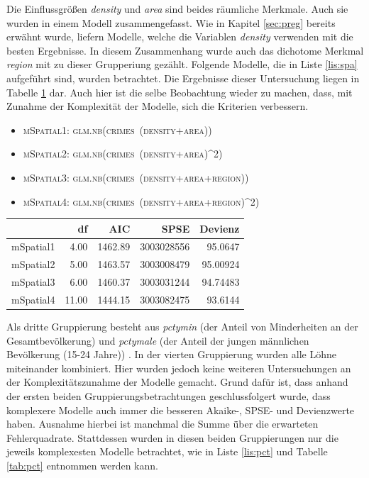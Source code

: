 \par\smallskip
Die Einflussgr\"o\ss{}en \textit{density} und \textit{area} sind beides r\"aumliche Merkmale. Auch sie wurden in einem Modell zusammengefasst. 
Wie in Kapitel \ref{sec:preg} bereits erw\"ahnt wurde, liefern Modelle, welche die Variablen \textit{density} verwenden mit die besten Ergebnisse.
In diesem Zusammenhang wurde auch das dichotome Merkmal \textit{region} mit zu dieser Grupperiung gez\"ahlt.
Folgende Modelle, die in Liste \ref{lis:spa} aufgef\"uhrt sind, wurden betrachtet.
Die Ergebnisse dieser Untersuchung liegen in Tabelle \ref{tab:spa} dar.
Auch hier ist die selbe Beobachtung wieder zu machen, dass, mit Zunahme der Komplexit\"at der Modelle, sich die Kriterien verbessern.

\begin{itemize}
\item \textsc{mSpatial1: glm.nb(crimes~(density+area))}
\item \textsc{mSpatial2: glm.nb(crimes~(density+area)^2)}
\item \textsc{mSpatial3: glm.nb(crimes~(density+area+region))}
\item \textsc{mSpatial4: glm.nb(crimes~(density+area+region)^2)}
\label{lis:spa}
\end{itemize}

\begin{table}[ht]
\centering
\begin{tabular}{rrrrr}
  \hline
 & df & AIC & SPSE & Devienz\\ 
  \hline
mSpatial1 & 4.00 & 1462.89 & 3003028556 & 95.0647\\ 
  mSpatial2 & 5.00 & 1463.57 & 3003008479 & 95.00924\\ 
  mSpatial3 & 6.00 & 1460.37 & 3003031244 & 94.74483\\ 
  mSpatial4 & 11.00 & 1444.15 & 3003082475 & 93.6144\\ 
   \hline
\end{tabular}
\label{tab:spa}
\end{table}

\par\smallskip
Als dritte Gruppierung besteht aus \textit{pctymin} (der Anteil von Minderheiten an der Gesamtbev\"olkerung) und \textit{pctymale} (der Anteil der jungen m\"annlichen Bev\"olkerung (15-24 Jahre)) .
In der vierten Gruppierung wurden alle L\"ohne miteinander kombiniert.
Hier wurden jedoch keine weiteren Untersuchungen an der Komplexit\"atszunahme der Modelle gemacht.
Grund daf\"ur ist, dass anhand der ersten beiden Gruppierungsbetrachtungen geschlussfolgert wurde, dass komplexere Modelle auch immer die besseren Akaike-, SPSE- und Devienzwerte haben.
Ausnahme hierbei ist manchmal die Summe \"über die erwarteten Fehlerquadrate.
Stattdessen wurden in diesen beiden Gruppierungen nur die jeweils komplexesten Modelle betrachtet, wie in Liste \ref{lis:pct} und Tabelle \ref{tab:pct} entnommen werden kann.



